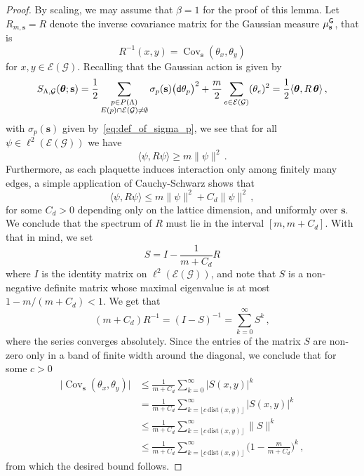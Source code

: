 \documentclass[11pt]{article}
\theoremstyle{definition}
\theoremstyle{remark}
\numberwithin{theorem}{section}
\newcommand{\cE}{\mathcal{E}}
\newcommand{\Cov}{\operatorname{Cov}}
\begin{document}
    \begin{proof}
        By scaling, we may assume that $\beta = 1$ for the proof of this lemma. Let $R_{m,\mathbf{s}} = R$ denote the inverse covariance matrix for the Gaussian measure $\mu_{\mathbf{s}}^{\sf G}$, that is
        \[
        R^{-1}(x,y) = \Cov_{\mathbf{s}}(\theta_x,\theta_y)
        \]
        for $x,y\in \cE(\mathcal{G})$. Recalling that the Gaussian action is given by
        \begin{equation*}
        S_{\Lambda,\mathcal{G}}(\boldsymbol{\theta};\mathbf{s}) = \frac{1}{2} \sum_{\substack{p\in P(\Lambda) \\ E(p)\cap \cE(\mathcal{G}) \not= \emptyset}}  \sigma_p(\mathbf{s}) \big({\sf d}\theta_p\big)^2 + \frac{m}{2}\sum_{e\in \cE(\mathcal{G})} (\theta_e)^2 = \frac{1}{2} \langle  \boldsymbol{\theta} , R \, \boldsymbol{\theta} \rangle \, , 
    \end{equation*}
    with $\sigma_p(\mathbf{s})$ given by~\eqref{eq:def_of_sigma_p}, we see that for all $\psi\in \ell^2(\cE(\mathcal{G}))$ we have
     \begin{equation*}
         \langle \psi , R \psi \rangle  \ge m\| \psi \|^2 \, . 
     \end{equation*}
     Furthermore, as each plaquette induces interaction only among finitely many edges, a simple application of Cauchy-Schwarz shows that
     \begin{equation*}
         \langle \psi , R \psi \rangle \le m \| \psi \|^2 + C_d \| \psi \|^2 \, ,
     \end{equation*}
     for some $C_d>0$ depending only on the lattice dimension, and uniformly over $\mathbf{s}$. We conclude that the spectrum of $R$ must lie in the interval $[m,m+C_d]$. With that in mind, we set
     \[
     S = I - \frac{1}{m+C_d} R
     \]
     where $I$ is the identity matrix on $\ell^2(\cE(\mathcal{G}))$, and note that $S$ is a non-negative definite matrix whose maximal eigenvalue is at most $1 - m/(m+C_d)<1$. We get that
     \[
     (m+C_d) R^{-1} = (I-S)^{-1} = \sum_{k=0}^{\infty} S^k \, ,
     \]
     where the series converges absolutely. Since the entries of the matrix $S$ are non-zero only in a band of finite width around the diagonal, we conclude that for some $c>0$
     \begin{align*}
         \big| \Cov_{\mathbf{s}}(\theta_x,\theta_y) \big| &\le \frac{1}{m+C_d} \sum_{k=0}^\infty |S(x,y)|^k \\ &= \frac{1}{m+C_d} \sum_{k= \lfloor c \, \text{dist}(x,y) \rfloor }^\infty |S(x,y)|^k \\ &\le \frac{1}{m+C_d} \sum_{k= \lfloor c \, \text{dist}(x,y) \rfloor }^\infty \| S\|^k  \\ & \le \frac{1}{m+C_d} \sum_{k= \lfloor c \, \text{dist}(x,y) \rfloor }^\infty  \Big(1-\frac{m}{m+C_d}\Big)^k \, ,
     \end{align*}
     from which the desired bound follows.  
    \end{proof}
\end{document}
